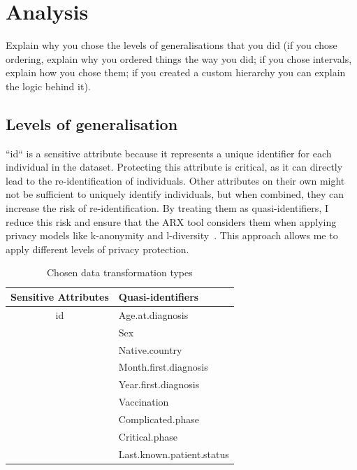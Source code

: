 
\newpage


\section{Analysis}

Explain why you chose the levels of generalisations that you did (if you chose ordering, explain why you ordered things the way you did; if you chose intervals, explain how you chose them; if you created a custom hierarchy you can explain the logic behind it).

\subsection{Levels of generalisation}

``id`` is a sensitive attribute because it represents a unique identifier for each individual in the dataset. Protecting this attribute
is critical, as it can directly lead to the re-identification of individuals. Other attributes on their own might not be sufficient to
uniquely identify individuals, but when combined, they can increase the risk of
re-identification. By treating them as quasi-identifiers, I reduce this risk and ensure that the ARX tool considers them when applying
privacy models like k-anonymity and l-diversity~\cite[]{arx}. This approach allows me to apply different levels of privacy protection.

\begin{table}[ht]
  \centering
  \caption{Chosen data transformation types}
  \begin{tabular}{cl}
    \toprule
    \textbf{Sensitive Attributes} & \textbf{Quasi-identifiers} \\
    \midrule
    id                            & Age.at.diagnosis           \\
    & Sex                        \\
    & Native.country             \\
    & Month.first.diagnosis      \\
    & Year.first.diagnosis       \\
    & Vaccination                \\
    & Complicated.phase          \\
    & Critical.phase             \\
    & Last.known.patient.status  \\
    \bottomrule
  \end{tabular}\label{tab:table}
\end{table}


